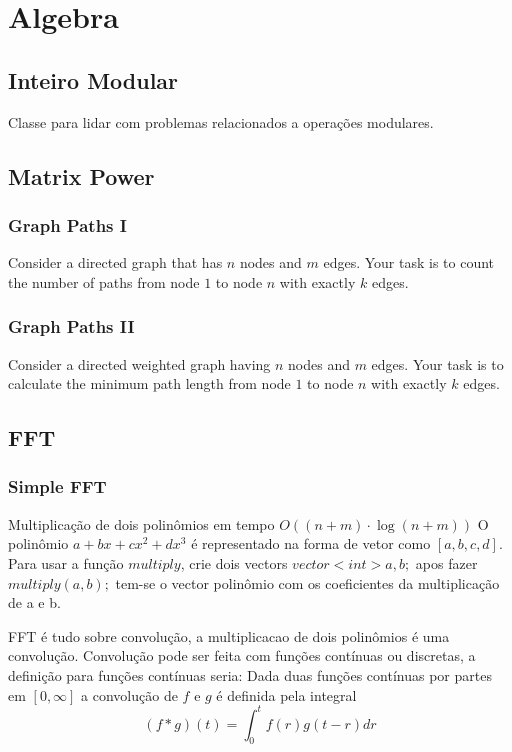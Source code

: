 \chapter{Algebra}
    
    \section{Inteiro Modular}
        \tab Classe para lidar com problemas relacionados a operações modulares.
        
    \section{Matrix Power}
        \subsection{Graph Paths I}
        \tab Consider a directed graph that has $n$ nodes and $m$ edges. Your task is to count the number of paths from node $1$ to node $n$ with exactly $k$ edges.
        
        
        \subsection{Graph Paths II}
        \tab Consider a directed weighted graph having $n$ nodes and $m$ edges. Your task is to calculate the minimum path length from node $1$ to node $n$ with exactly $k$ edges.
        
    \section{FFT}
        \subsection{Simple FFT}
        \tab Multiplicação de dois polinômios em tempo $O((n+m) \cdot \log(n+m))$
        O polinômio $ a + bx + cx^2 + dx^3$ é representado na forma de vetor como $[a, b, c, d]$.
        Para usar a função $multiply$, crie dois vectors $vector<int> a, b;$ apos fazer $multiply(a, b);$ tem-se o vector polinômio com os coeficientes da multiplicação de a e b.
        
        FFT é tudo sobre convolução, a multiplicacao de dois polinômios é uma convolução. Convolução pode ser feita com funções contínuas ou discretas, a definição para funções contínuas seria:
        Dada duas funções contínuas por partes em $[0,\infty]$ a convolução de $f$ e $g$ é definida pela integral
        \[
            (f*g)(t) = \int_0^t f(r)g(t-r)dr
        \]

